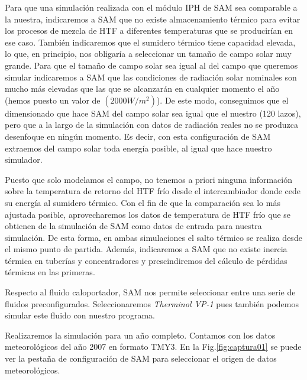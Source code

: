 Para que una simulación realizada con el módulo IPH de SAM sea comparable a la nuestra, indicaremos a SAM que no existe almacenamiento térmico para evitar los procesos de mezcla de HTF a diferentes temperaturas que se producirían en ese caso. También indicaremos que el sumidero térmico tiene capacidad elevada, lo que, en principio, nos obligaría a seleccionar un tamaño de campo solar muy grande. Para que el tamaño de campo solar sea igual al del campo que queremos simular indicaremos a SAM que las condiciones de radiación solar nominales son mucho más elevadas que las que se alcanzarán en cualquier momento el año (hemos puesto un valor de $(2000 W/m^2)$). De este modo, conseguimos que el dimensionado que hace SAM del campo solar sea igual que el nuestro (120 lazos), pero que a la largo de la simulación con datos de radiación reales no se produzca desenfoque en ningún momento. Es decir, con esta configuración de SAM extraemos del campo solar toda energía posible, al igual que hace nuestro simulador.

Puesto que solo modelamos el campo, no tenemos a priori ninguna información sobre la temperatura de retorno del HTF frío desde el intercambiador donde cede su energía al sumidero térmico. Con el fin de que la comparación sea lo más ajustada posible, aprovecharemos los datos de temperatura de HTF frío que se obtienen de la simulación de SAM como datos de entrada para nuestra simulación. De esta forma, en ambas simulaciones el salto térmico se realiza desde el mismo punto de partida. Además, indicaremos a SAM que no existe inercia térmica en tuberías y concentradores y prescindiremos del cálculo de pérdidas térmicas en las primeras.

Respecto al fluido caloportador, SAM nos permite seleccionar entre una serie de fluidos preconfigurados. Seleccionaremos \emph{Therminol VP-1} pues también podemos simular este fluido con nuestro programa.

Realizaremos la simulación para un año completo. Contamos con los datos meteorológicos del año 2007 en formato TMY3.  En la Fig.\ref{fig:captura01} se puede ver la pestaña de configuración de SAM para seleccionar el origen de datos meteorológicos.

